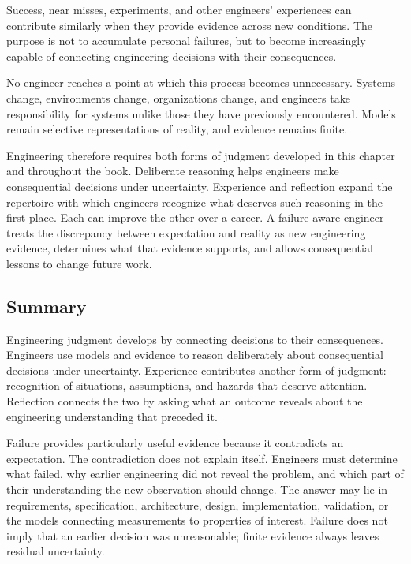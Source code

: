 Success, near misses, experiments, and other engineers' experiences can contribute similarly when
they provide evidence across new conditions. The purpose is not to accumulate personal failures,
but to become increasingly capable of connecting engineering decisions with their consequences.

No engineer reaches a point at which this process becomes unnecessary. Systems change, environments
change, organizations change, and engineers take responsibility for systems unlike those they have
previously encountered. Models remain selective representations of reality, and evidence remains
finite.

Engineering therefore requires both forms of judgment developed in this chapter and throughout the
book. Deliberate reasoning helps engineers make consequential decisions under uncertainty.
Experience and reflection expand the repertoire with which engineers recognize what deserves such
reasoning in the first place. Each can improve the other over a career. A failure-aware engineer
treats the discrepancy between expectation and reality as new engineering evidence, determines what
that evidence supports, and allows consequential lessons to change future work.

\subsection{Summary}\label{summary}

Engineering judgment develops by connecting decisions to their consequences. Engineers use models
and evidence to reason deliberately about consequential decisions under uncertainty. Experience
contributes another form of judgment: recognition of situations, assumptions, and hazards that
deserve attention. Reflection connects the two by asking what an outcome reveals about the
engineering understanding that preceded it.

Failure provides particularly useful evidence because it contradicts an expectation. The
contradiction does not explain itself. Engineers must determine what failed, why earlier
engineering did not reveal the problem, and which part of their understanding the new observation
should change. The answer may lie in requirements, specification, architecture, design,
implementation, validation, or the models connecting measurements to properties of interest.
Failure does not imply that an earlier decision was unreasonable; finite evidence always leaves
residual uncertainty.

